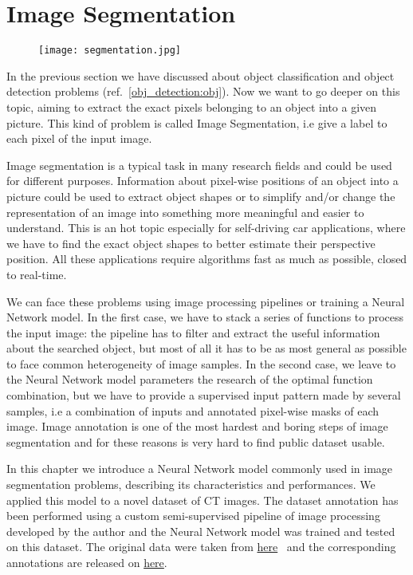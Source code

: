 \documentclass{standalone}
\begin{document}
\section[Segmentation]{Image Segmentation}\label{segmentation:unet}

\begin{center}
\begin{figure}[htbp]
\centering
\texttt{[image: segmentation.jpg]}
\label{fig:segmentation}
\end{figure}
\end{center}

In the previous section we have discussed about object classification and object detection problems (ref.~\ref{obj_detection:obj}).
Now we want to go deeper on this topic, aiming to extract the exact pixels belonging to an object into a given picture.
This kind of problem is called Image Segmentation, i.e give a label to each pixel of the input image.

Image segmentation is a typical task in many research fields and could be used for different purposes.
Information about pixel-wise positions of an object into a picture could be used to extract object shapes or to simplify and/or change the representation of an image into something more meaningful and easier to understand.
This is an hot topic especially for self-driving car applications, where we have to find the exact object shapes to better estimate their perspective position.
All these applications require algorithms fast as much as possible, closed to real-time.

We can face these problems using image processing pipelines or training a Neural Network model.
In the first case, we have to stack a series of functions to process the input image: the pipeline has to filter and extract the useful information about the searched object, but most of all it has to be as most general as possible to face common heterogeneity of image samples.
In the second case, we leave to the Neural Network model parameters the research of the optimal function combination, but we have to provide a supervised input pattern made by several samples, i.e a combination of inputs and annotated pixel-wise masks of each image.
Image annotation is one of the most hardest and boring steps of image segmentation and for these reasons is very hard to find public dataset usable.

In this chapter we introduce a Neural Network model commonly used in image segmentation problems, describing its characteristics and performances.
We applied this model to a novel dataset of CT images.
The dataset annotation has been performed using a custom semi-supervised pipeline of image processing developed by the author and the Neural Network model was trained and tested on this dataset.
The original data were taken from \href{https://mrl.sci.utah.edu/software/normal-hip-image-data/}{here}~\cite{doi:10.1002/jor.22040} and the corresponding annotations are released on \href{}{here}. %
\end{document}
